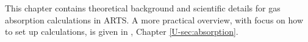 \def\alphacs{\alpha_{\mbox{\rm \small c,s}}} 
\def\alphacf{\alpha_{\mbox{\rm \small c,f}}}
%
\def\alphampmotot{\alpha^{\mbox{\rm \small MPM87}}_{\mbox{\small tot}}} 
\def\alphampmmtot{\alpha^{\mbox{\rm \small MPM89}}_{\mbox{\small tot}}} 
\def\alphampmntot{\alpha^{\mbox{\rm \small MPM93}}_{\mbox{\small tot}}} 
\def\alphapwrtot{\alpha^{\mbox{\rm \small R98}}_{\mbox{\small tot}}} 
\def\alphacptot{\alpha^{\mbox{\rm \small CP98}}_{\mbox{\small tot}}} 
%
\def\alphampmol{\alpha^{\mbox{\rm \small MPM87}}_{\mbox{\small $\ell$}}} 
\def\alphampmml{\alpha^{\mbox{\rm \small MPM89}}_{\mbox{\small $\ell$}}} 
\def\alphampmnl{\alpha^{\mbox{\rm \small MPM93}}_{\mbox{\small $\ell$}}} 
\def\alphampml{\alpha^{\mbox{\rm \small MPM}}_{\mbox{\small $\ell$}}} 
\def\alphapwrl{\alpha^{\mbox{\rm \small R98}}_{\mbox{\small $\ell$}}} 
\def\alphacpl{\alpha^{\mbox{\rm \small CP98}}_{\mbox{\small $\ell$}}} 
%
\def\alphampmoc{\alpha^{\mbox{\rm \small MPM87}}_{\rm c}} 
\def\alphampmmc{\alpha^{\mbox{\rm \small MPM89}}_{\rm c}} 
\def\alphampmnc{\alpha^{\mbox{\rm \small MPM93}}_{\rm c}} 
\def\alphapwrc{\alpha^{\mbox{\rm \small R98}}_{\rm c}} 
\def\alphacpc{\alpha^{\mbox{\rm \small CP98}}_{\rm c}} 
%
\def\gamk{\gamma_{\mbox{\rm \small k}}}
\def\gamc{\gamma_{\mbox{\rm \small c}}}
%
\def\ws{w_{\mbox{\rm \small s,k}}}
\def\xs{x_{\mbox{\rm \small s,k}}}
\def\wf{w_{\mbox{\rm \small f,k}}}
\def\xf{x_{\mbox{\rm \small f,k}}}
%
\def\wn{\bar{\nu}}
\def\nucc{\nu_{\mbox{\rm \small c}}}
\def\nucut{\nu_{\mbox{\rm \small cutoff}}}
\def\nuo{\nu_{\mbox{\rm \small 0}}}
\def\nuk{\nu_{\mbox{\rm \small k}}}
%
\def\shape{F(\nu,\nuk)}
\def\shapec{F_{c}(\nu,\nuk)}
\def\shapefp{f_{c}(\nu,+\nuk)}
\def\shapefm{f_{c}(\nu,-\nuk)}
\def\shapefpm{f_{c}(\nu,\pm\nuk)}
\def\inten{S_{\mbox{\rm \small k}}(T)}
\def\inteno{S_{\mbox{\rm \small k}}(300\,K)}
\def\intencp{S_{\mbox{\rm \small 0}}(T)}
%
\def\cx{C_{\mbox{\rm \small x}}}
\def\cs{C_{\mbox{\rm \small H}_{2}\mbox{\rm \small O}}} 
\def\cf{C_{\mbox{\rm N}_{2}}} 
\def\cxo{C^{\mbox{\rm o}}_{\mbox{\rm \small X}}} 
\def\cso{C^{\mbox{\rm o}}_{\mbox{\rm \small H}_{2}\mbox{\rm \small O}}} 
\def\cfo{C^{\mbox{\rm o}}_{\mbox{\rm \small N}_{2}}} 
\def\cao{C^{\mbox{\rm o}}_{\mbox{\rm \small air}}}
\def\cdo{C^{\mbox{\rm o}}_{\mbox{\rm \small d}}}
\def\xx{{\rm n}_{\mbox{\rm \small  x}}} 
\def\xs{{\rm n}_{\mbox{\rm \small  s}}} 
\def\xf{{\rm n}_{\mbox{\rm \small  f}}} 
\def\xd{{\rm n}_{\mbox{\rm \small  d}}}
%

This chapter contains theoretical background and scientific details
for gas absorption calculations in ARTS. A more practical overview,
with focus on how to set up calculations, is given in \user, Chapter
\ref{U-sec:absorption}.

